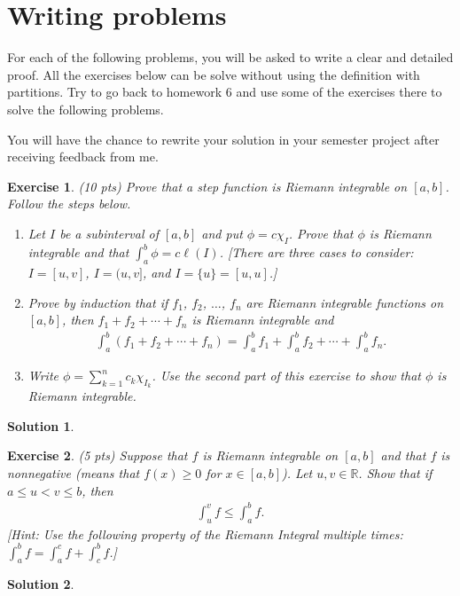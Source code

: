 \documentclass[12pt]{article}
\newcommand{\bR}{\mathbb{R}}
\theoremstyle{plain}
\newtheorem{exer}{\textbf{Exercise}}}
\theoremstyle{plain}
\newtheorem*{sol}{\textbf{Solution}}}
\begin{document}
\section{Writing problems}
For each of the following problems, you will be asked to write a clear and detailed proof. All the exercises below can be solve without using the definition with partitions. Try to go back to homework 6 and use some of the exercises there to solve the following problems. 

You will have the chance to rewrite your solution in your semester project after receiving feedback from me.

\begin{exer}
(10 pts)
Prove that a step function is Riemann integrable on $[a, b]$. Follow the steps below.
\begin{enumerate}[label=\textbf{\alph*)}]
\item Let $I$ be a subinterval of $[a, b]$ and put $\phi = c \chi_I$. Prove that $\phi$ is Riemann integrable and that $\int_a^b \phi = c \ell (I)$. [There are three cases to consider: $I = [u, v]$, $I = (u, v]$, and $I = \{ u \} = [u, u]$.]
\item Prove by induction that if $f_1$, $f_2$, $\ldots$, $f_n$ are Riemann integrable functions on $[a, b]$, then $f_1 + f_2 + \cdots + f_n$ is Riemann integrable and
	\begin{align*}
	\int_a^b (f_1 + f_2 + \cdots + f_n) = \int_a^b f_1 + \int_a^b f_2 + \cdots + \int_a^b f_n .
	\end{align*}
\item Write $\phi = \sum_{k = 1}^n c_k \chi_{I_k}$. Use the second part of this exercise to show that $\phi$ is Riemann integrable.
\end{enumerate}
\end{exer}
\begin{sol}

\end{sol}

\begin{exer}
(5 pts)
Suppose that $f$ is Riemann integrable on $[a, b]$ and that $f$ is nonnegative (means that $f(x) \geq 0$ for $x \in [a, b]$). Let $u, v \in \bR$. Show that if $a \leq u < v \leq b$, then
	\begin{align*}
	\int_u^v f \leq \int_a^b f .
	\end{align*}
[Hint: Use the following property of the Riemann Integral multiple times: $\int_a^b f = \int_a^c f + \int_c^b f$.]
\end{exer}
\begin{sol}

\end{sol}
\end{document}
